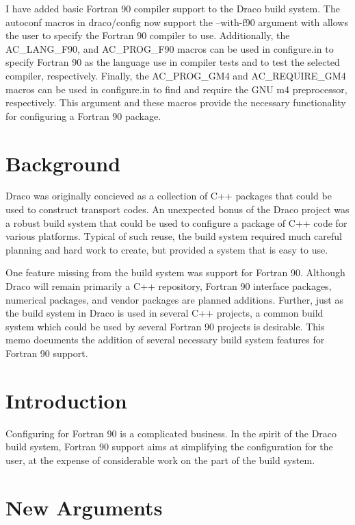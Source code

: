 \documentclass[11pt]{nmemo}
\begin{document}
I have added basic Fortran 90 compiler support to the Draco build
system.  The autoconf macros in draco/config now support the
--with-f90 argument with allows the user to specify the Fortran 90
compiler to use.  Additionally, the AC\_LANG\_F90, and AC\_PROG\_F90
macros can be used in configure.in to specify Fortran 90 as the
language use in compiler tests and to test the selected compiler,
respectively.  Finally, the AC\_PROG\_GM4 and AC\_REQUIRE\_GM4 macros
can be used in configure.in to find and require the GNU m4
preprocessor, respectively.  This argument and these macros provide
the necessary functionality for configuring a Fortran 90 package.

\section{Background}

Draco was originally concieved as a collection of C++ packages that
could be used to construct transport codes.  An unexpected bonus of
the Draco project was a robust build system that could be used to
configure a package of C++ code for various platforms.  Typical of
such reuse, the build system required much careful planning and hard
work to create, but provided a system that is easy to use.

One feature missing from the build system was support for Fortran 90.
Although Draco will remain primarily a C++ repository, Fortran 90
interface packages, numerical packages, and vendor packages are
planned additions.  Further, just as the build system in Draco is used
in several C++ projects, a common build system which could
be used by several Fortran 90 projects is desirable.   This memo
documents the addition of several necessary build system features for
Fortran 90 support.

\newpage

\section{Introduction}

Configuring for Fortran 90 is a complicated business.  In the spirit
of the Draco build system, Fortran 90 support aims at simplifying
the configuration for the user, at the expense of considerable work on
the part of the build system.

\section{New Arguments}
\end{document}
